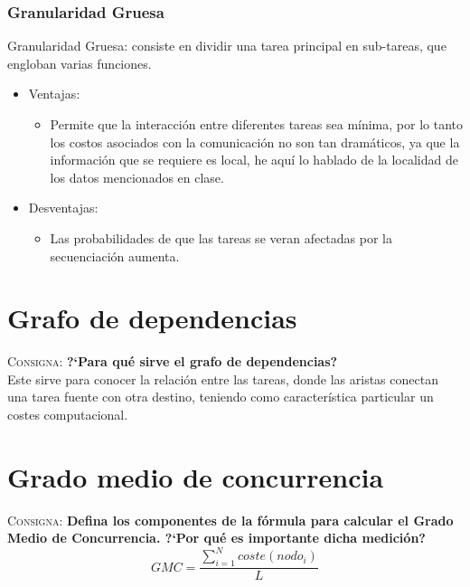 \documentclass{article}
\begin{document}
\subsubsection{Granularidad Gruesa}
Granularidad Gruesa: consiste en dividir una tarea principal en sub-tareas, que
engloban varias funciones.
\begin{itemize}
\item Ventajas:
	\begin{itemize}
	\item Permite que la interacci\'on entre diferentes tareas sea m\'inima, por
lo tanto los costos asociados con la comunicaci\'on no son tan dram\'aticos, ya que
la informaci\'on que se requiere es local, he aqu\'i lo hablado de la localidad
de los datos mencionados en clase.
	\end{itemize}
\item Desventajas:
	\begin{itemize}
	\item Las probabilidades de que las tareas se veran afectadas por la
secuenciaci\'on aumenta.
	\end{itemize}
\end{itemize}

\section{Grafo de dependencias}
\textsc{Consigna}: \textbf{?`Para qu\'e sirve el grafo de dependencias?}\\

Este sirve para conocer la relación entre las tareas, donde las aristas
conectan una tarea fuente con otra destino, teniendo como característica
particular un costes computacional.

\section{Grado medio de concurrencia}
\textsc{Consigna}: \textbf{Defina los componentes de la f\'ormula para calcular
el Grado Medio de Concurrencia. ?`Por qu\'e es importante dicha medici\'on?}\\

\begin{equation}
	GMC=\frac{\sum_{i=1}^{N} coste(nodo_{i})}{L}
\end{equation}
\end{document}

